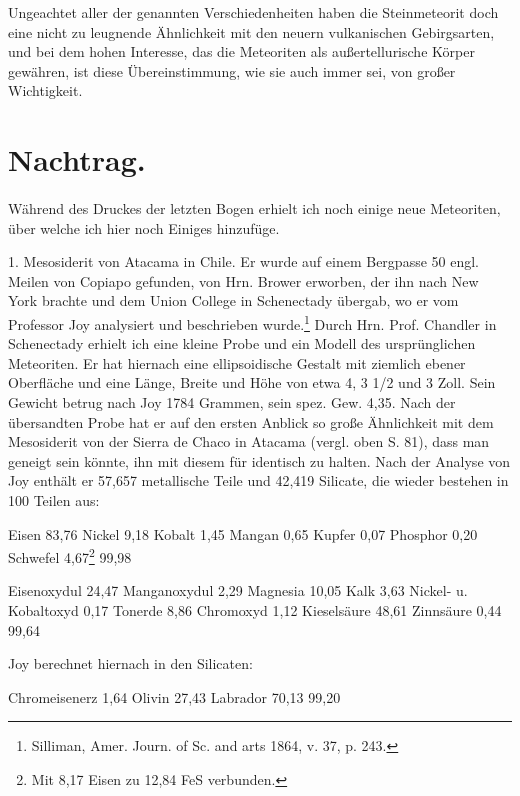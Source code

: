 \documentclass[a4paper, 11pt, oneside]{article}
\begin{document}
Ungeachtet aller der genannten Verschiedenheiten haben die Steinmeteorit doch eine nicht zu leugnende Ähnlichkeit mit den neuern vulkanischen Gebirgsarten, und bei dem hohen Interesse, das die Meteoriten als außertellurische Körper gewähren, ist diese Übereinstimmung, wie sie auch immer sei, von großer Wichtigkeit.
\clearpage
\section{Nachtrag.}
\paragraph{}
Während des Druckes der letzten Bogen erhielt ich noch einige neue Meteoriten, über welche ich hier noch Einiges hinzufüge.

1. Mesosiderit von Atacama in Chile. Er wurde auf einem Bergpasse 50 engl. Meilen von Copiapo gefunden, von Hrn. Brower erworben, der ihn nach New York brachte und dem Union College in Schenectady übergab, wo er vom Professor Joy analysiert und beschrieben wurde.\footnote{Silliman, Amer. Journ. of Sc. and arts 1864, v. 37, p. 243.} Durch Hrn. Prof. Chandler in Schenectady erhielt ich eine kleine Probe und ein Modell des ursprünglichen Meteoriten. Er hat hiernach eine ellipsoidische Gestalt mit ziemlich ebener Oberfläche und eine Länge, Breite und Höhe von etwa 4, 3 1/2 und 3 Zoll. Sein Gewicht betrug nach Joy 1784 Grammen, sein spez. Gew. 4,35. Nach der übersandten Probe hat er auf den ersten Anblick so große Ähnlichkeit mit dem Mesosiderit von der Sierra de Chaco in Atacama (vergl. oben S. 81), dass man geneigt sein könnte, ihn mit diesem für identisch zu halten. Nach der Analyse von Joy enthält er 57,657 metallische Teile und 42,419 Silicate, die wieder bestehen in 100 Teilen aus:

Eisen 83,76  
Nickel 9,18  
Kobalt 1,45  
Mangan 0,65  
Kupfer 0,07  
Phosphor 0,20  
Schwefel 4,67\footnote{Mit 8,17 Eisen zu 12,84 FeS verbunden.}  
99,98 

Eisenoxydul 24,47  
Manganoxydul 2,29  
Magnesia 10,05  
Kalk 3,63  
Nickel- u. Kobaltoxyd 0,17  
Tonerde 8,86  
Chromoxyd 1,12  
Kieselsäure 48,61  
Zinnsäure 0,44  
99,64  

Joy berechnet hiernach in den Silicaten:

Chromeisenerz 1,64  
Olivin 27,43  
Labrador 70,13  
99,20  
\end{document}
